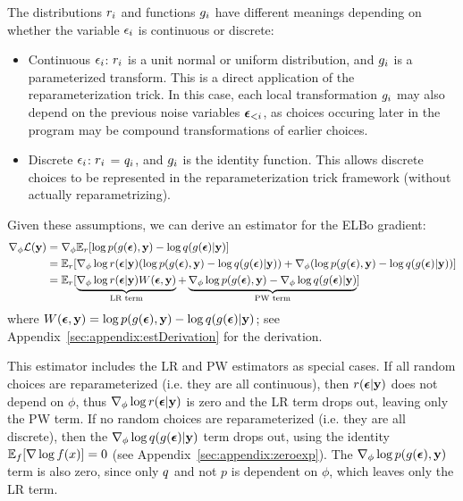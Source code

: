 The distributions $r_i$ and functions $g_i$ have different meanings depending on whether the variable $\epsilon_i$ is continuous or discrete:
\begin{itemize}
\item{Continuous $\epsilon_i$: $r_i$ is a unit normal or uniform distribution, and $g_i$ is a parameterized transform. This is a direct application of the reparameterization trick. In this case, each local transformation $g_i$ may also depend on the previous noise variables $\bm{\epsilon}_{<i}$, as choices occuring later in the program may be compound transformations of earlier choices.}
\item{Discrete $\epsilon_i$: $r_i$ = $q_i$, and $g_i$ is the identity function. This allows discrete choices to be represented in the reparameterization trick framework (without actually reparametrizing).}
\end{itemize}
Given these assumptions, we can derive an estimator for the ELBo gradient:
\begin{align}
\label{eq:hybridEstimator}
\gradparams \elbo
%
&= \gradparams \expect_\reparamDist [ \log p(\xformedVars, \observedVars) - \log \guide(\xformedVars | \observedVars) ]\\
%
&= \expect_\reparamDist [ \gradparams \log \reparamDist(\reparamVars | \observedVars) ( \log p(\xformedVars, \observedVars) - \log \guide(\xformedVars | \observedVars) ) + \gradparams( \log p(\xformedVars, \observedVars) - \log \guide(\xformedVars | \observedVars) )]\nonumber\\
%
&= \expect_\reparamDist [ \underbrace{\gradparams \log \reparamDist(\reparamVars | \observedVars) W(\reparamVars, \observedVars)}_{\text{LR term}} + \underbrace{\gradparams \log p(\xformedVars, \observedVars) - \gradparams \log \guide(\xformedVars | \observedVars)}_{\text{PW term}} ]\nonumber
\end{align}
where $W(\bm{\epsilon}, \mathbf{y}) = \log p(g(\bm{\epsilon}), \mathbf{y}) - \log q(g(\bm{\epsilon}) | \mathbf{y})$; see Appendix~\ref{sec:appendix:estDerivation} for the derivation. 

This estimator includes the LR and PW estimators as special cases. If all random choices are reparameterized (i.e. they are all continuous), then $r(\bm{\epsilon} | \mathbf{y})$ does not depend on $\phi$, thus $\nabla_\phi \log r(\bm{\epsilon} | \mathbf{y})$ is zero and the LR term drops out, leaving only the PW term. If no random choices are reparameterized (i.e. they are all discrete), then the $\nabla_\phi \log q(g(\bm{\epsilon}) | \mathbf{y})$ term drops out, using the identity $\mathbb{E}_f[\nabla \log f(x)] = 0$ (see Appendix~\ref{sec:appendix:zeroexp}). The $\nabla_\phi \log p(g(\bm{\epsilon}), \mathbf{y})$ term is also zero, since only $q$ and not $p$ is dependent on $\phi$, which leaves only the LR term.

